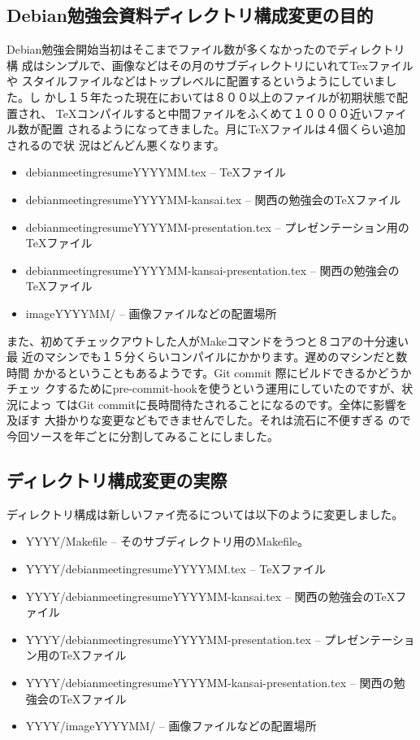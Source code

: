 \documentclass[mingoth,a4paper]{jsarticle}
\begin{document}
\subsection{Debian勉強会資料ディレクトリ構成変更の目的}

Debian勉強会開始当初はそこまでファイル数が多くなかったのでディレクトリ構
成はシンプルで、画像などはその月のサブディレクトリにいれてTexファイルや
スタイルファイルなどはトップレベルに配置するというようにしていました。し
かし１５年たった現在においては８００以上のファイルが初期状態で配置され、
TeXコンパイルすると中間ファイルをふくめて１００００近いファイル数が配置
されるようになってきました。月にTeXファイルは４個くらい追加されるので状
況はどんどん悪くなります。

\begin{itemize}
 \item debianmeetingresumeYYYYMM.tex -- TeXファイル
 \item debianmeetingresumeYYYYMM-kansai.tex -- 関西の勉強会のTeXファイル
 \item debianmeetingresumeYYYYMM-presentation.tex -- プレゼンテーション用のTeXファイル
 \item debianmeetingresumeYYYYMM-kansai-presentation.tex -- 関西の勉強会のTeXファイル
 \item imageYYYYMM/ -- 画像ファイルなどの配置場所
\end{itemize}

また、初めてチェックアウトした人がMakeコマンドをうつと８コアの十分速い最
近のマシンでも１５分くらいコンパイルにかかります。遅めのマシンだと数時間
かかるということもあるようです。Git commit 際にビルドできるかどうかチェッ
クするためにpre-commit-hookを使うという運用にしていたのですが、状況によっ
てはGit commitに長時間待たされることになるのです。全体に影響を及ぼす
大掛かりな変更などもできませんでした。それは流石に不便すぎる
ので今回ソースを年ごとに分割してみることにしました。

\subsection{ディレクトリ構成変更の実際}


ディレクトリ構成は新しいファイ売るについては以下のように変更しました。

\begin{itemize}
 \item YYYY/Makefile -- そのサブディレクトリ用のMakefile。
 \item YYYY/debianmeetingresumeYYYYMM.tex -- TeXファイル
 \item YYYY/debianmeetingresumeYYYYMM-kansai.tex -- 関西の勉強会のTeXファイル
 \item YYYY/debianmeetingresumeYYYYMM-presentation.tex -- プレゼンテーション用のTeXファイル
 \item YYYY/debianmeetingresumeYYYYMM-kansai-presentation.tex -- 関西の勉強会のTeXファイル
 \item YYYY/imageYYYYMM/ -- 画像ファイルなどの配置場所
\end{itemize}
\end{document}
